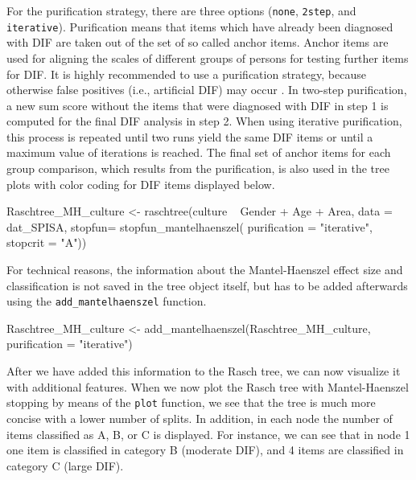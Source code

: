 \documentclass[doc,floatsintext,natbib]{apa7}
\begin{document}
For the purification strategy, there are three options (\texttt{none}, \texttt{2step}, and \texttt{iterative}). Purification means that items which have already been diagnosed with DIF are taken out of the set of so called anchor items. Anchor items are used for aligning the scales of different groups of persons for testing further items for DIF. It is highly recommended to use a purification strategy, because otherwise false positives (i.e., artificial DIF) may occur \citep[cf., e.g.,][and the refereces therein]{DebStrZei:2022:CRC,HennyDeba23,Kopfetal:2015:EPM}. In two-step purification, a new sum score without the items that were diagnosed with DIF in step 1 is computed for the final DIF analysis in step 2. When using iterative purification, this process is repeated until two runs yield the same DIF items or until a maximum value of iterations is reached. 
The final set of anchor items for each group comparison, which results from the purification, is also used in the tree plots with color coding for DIF items displayed below. 



\begin{Schunk}
\begin{Sinput}
 Raschtree_MH_culture <- raschtree(culture ~  Gender + Age + Area, 
                                   data = dat_SPISA, 
                                   stopfun= stopfun_mantelhaenszel(
                                     purification = "iterative",
                                     stopcrit = "A"))
\end{Sinput}
\end{Schunk}

For technical reasons, the information about the Mantel-Haenszel effect size and classification is not saved in the tree object itself, but has to be added afterwards using the \texttt{add\_mantelhaenszel} function. 

\begin{Schunk}
\begin{Sinput}
 Raschtree_MH_culture <- add_mantelhaenszel(Raschtree_MH_culture, 
                                            purification = "iterative")
\end{Sinput}
\end{Schunk}

After we have added this information to the Rasch tree, we can now visualize it with additional features. When we now plot the Rasch tree with Mantel-Haenszel stopping by means of the \texttt{plot} function, we see that the tree is much more concise with a lower number of splits. In addition, in each node the number of items classified as A, B, or C is displayed. For instance, we can see that in node 1 one item is classified in category B (moderate DIF), and 4 items are classified in category C (large DIF).
\end{document}
